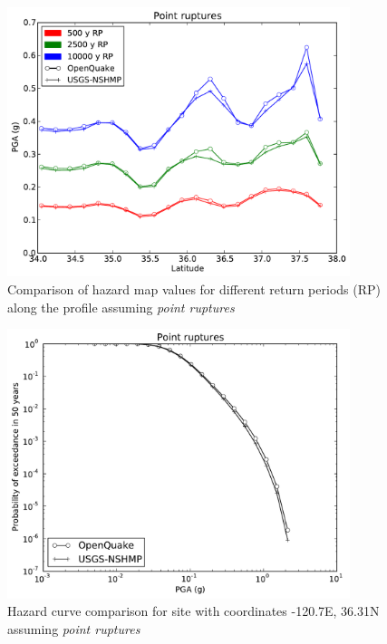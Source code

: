 \begin{figure}
\centering
\includegraphics[width=10cm]{./qareport/pictures/gridded_seismicity_oq_nshmp_point.pdf}
\caption{Comparison of hazard map values for different return periods (RP) along the profile assuming \textit{point ruptures}}
\label{fig:cal_grid_map_point}
\end{figure}

\begin{figure}
\centering
\includegraphics[width=10cm]{./qareport/pictures/-120pt7_36pt31_point.pdf}
\caption{Hazard curve comparison for site with coordinates -120.7E, 36.31N assuming \textit{point ruptures}}
\label{fig:cal_grid_curve_point}
\end{figure}

